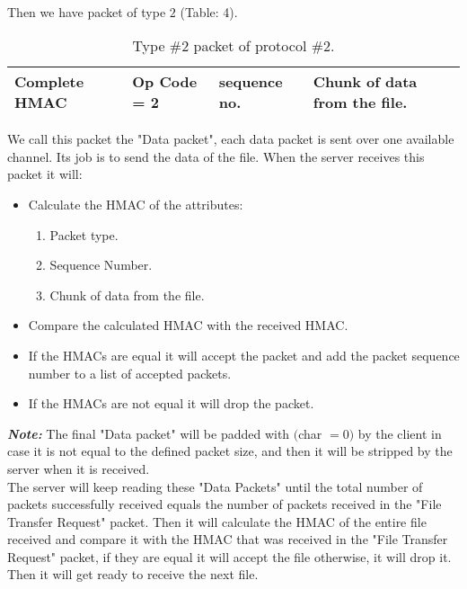\documentclass[main.tex]{subfiles}
\begin{document}
\paragraph{}
Then we have packet of type $2$ (Table: 4).\\
\begin{table*}[h!]
\begin{center}
\begin{tabu} to 1.1\textwidth { | X[c]  | X[c]  | X[c]  | X[c] | }
 \hline
 Complete HMAC & Op Code = 2 & sequence no. & Chunk of data from the file.\\
\hline
\end{tabu}
\caption{Type \#$2$ packet of protocol \#$2$.}
    \label{tab:table$4$}
\end{center}
\end{table*}

We call this packet the "Data packet", each data packet is sent over one available channel. Its job is to send the data of the file. When the server receives this packet it will: 
\begin{itemize}
\item Calculate the HMAC of the attributes:
\begin{enumerate}
\item Packet type.
\item Sequence Number.
\item Chunk of data from the file.
\end{enumerate}
\item Compare the calculated HMAC with the received HMAC.
\item If the HMACs are equal it will accept the packet and add the packet sequence number to a list of accepted packets.
\item If the HMACs are not equal it will drop the packet.
\end{itemize}
\textbf{\textit{Note:}} The final "Data packet" will be padded with $($char $= 0)$ by the client in case it is not equal to the defined packet size, and then it will be stripped by the server when it is received.\\
The server will keep reading these "Data Packets" until the total number of packets successfully received equals the number of packets received in the "File Transfer Request" packet. Then it will calculate the HMAC of the entire file received and compare it with the HMAC that was received in the "File Transfer Request" packet, if they are equal it will accept the file otherwise, it will drop it. Then it will get ready to receive the next file.\\
\end{document}
